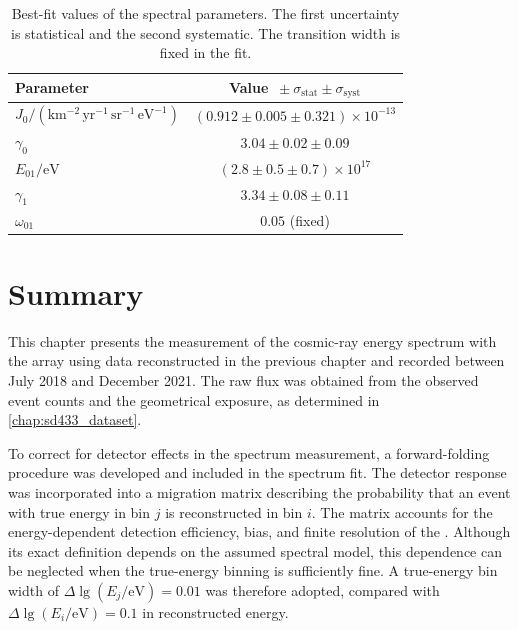 \documentclass[main.tex]{subfiles}
\begin{document}
\begin{table}
    \centering
    \caption{
        Best-fit values of the  spectral parameters.
        The first uncertainty is statistical and the second systematic.
        The transition width is fixed in the fit.
    }
    \label{table:sd433_spectral_parameters}
    \begin{tabular}{lc}
        \hline
        Parameter & Value $\,\pm\sigma_{\mathrm{stat}}\pm\sigma_{\mathrm{syst}}$ \\
        \hline
        $J_0/
        \left(
        \mathrm{km^{-2}\,yr^{-1}\,sr^{-1}\,eV^{-1}}
        \right)$
        & $(0.912\pm0.005\pm0.321)\times10^{-13}$ \\
        $\gamma_0$
        & $3.04\pm0.02\pm0.09$ \\
        $E_{01}/\mathrm{eV}$
        & $(2.8\pm0.5\pm0.7)\times10^{17}$ \\
        $\gamma_1$
        & $3.34\pm0.08\pm0.11$ \\
        $\omega_{01}$
        & $0.05$ (fixed) \\
        \hline
    \end{tabular}
\end{table}

\section{Summary}

This chapter presents the measurement of the cosmic-ray energy spectrum with the  array using data reconstructed in the previous chapter and recorded between July 2018 and December 2021.
The raw flux was obtained from the observed event counts and the geometrical exposure, as determined in \cref{chap:sd433_dataset}.

To correct for detector effects in the spectrum measurement, a forward-folding procedure was developed and included in the spectrum fit.
The detector response was incorporated into a migration matrix describing the probability that an event with true energy in bin $j$ is reconstructed in bin $i$.
The matrix accounts for the energy-dependent detection efficiency, bias, and finite resolution of the .
Although its exact definition depends on the assumed spectral model, this dependence can be neglected when the true-energy binning is sufficiently fine.
A true-energy bin width of $\Delta\lg(E_j/\mathrm{eV})=0.01$ was therefore adopted, compared with $\Delta\lg(E_i/\mathrm{eV})=0.1$ in reconstructed energy.
\end{document}
